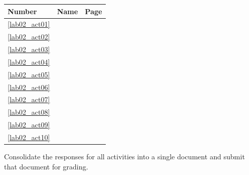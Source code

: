\begin{center}
  \begin{tabular}{lll}
    \hline 
    \textbf{Number} & \textbf{Name} & \textbf{Page} \\ 
    \hline 
    \ref{lab02_act01} & \nameref{lab02_act01} & \pageref{lab02_act01} \\ 
    \ref{lab02_act02} & \nameref{lab02_act02} & \pageref{lab02_act02} \\ 
    \ref{lab02_act03} & \nameref{lab02_act03} & \pageref{lab02_act03} \\ 
    \ref{lab02_act04} & \nameref{lab02_act04} & \pageref{lab02_act04} \\ 
    \ref{lab02_act05} & \nameref{lab02_act05} & \pageref{lab02_act05} \\ 
    \ref{lab02_act06} & \nameref{lab02_act06} & \pageref{lab02_act06} \\ 
    \ref{lab02_act07} & \nameref{lab02_act07} & \pageref{lab02_act07} \\ 
    \ref{lab02_act08} & \nameref{lab02_act08} & \pageref{lab02_act08} \\ 
    \ref{lab02_act09} & \nameref{lab02_act09} & \pageref{lab02_act09} \\ 
    \ref{lab02_act10} & \nameref{lab02_act10} & \pageref{lab02_act10} \\ 
    \hline 
  \end{tabular} 
\end{center}

Consolidate the responses for all activities into a single document and submit that document for grading.



